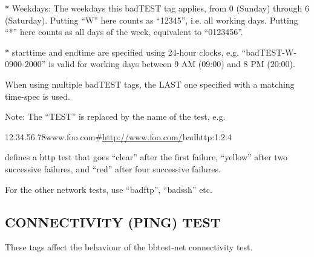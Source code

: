 \begin{description}
 * Weekdays: The weekdays this badTEST tag applies, from 0 (Sunday)
   through 6 (Saturday). Putting ``W'' here counts as ``12345'',
   i.e. all working days. Putting ``*'' here counts as all days of the
   week, equivalent to ``0123456''.  

 * starttime and endtime are specified using 24-hour clocks,
   e.g. ``badTEST-W-0900-2000'' is valid for working days between 9 AM
   (09:00) and 8 PM (20:00). 



  When using multiple badTEST tags, the LAST one specified with a matching time-spec is used. 


  Note: The ``TEST'' is replaced by the name of the test, e.g. 


  
12.34.56.78www.foo.com\#\url{http://www.foo.com/}badhttp:1:2:4 


  defines a http test that goes ``clear'' after the first failure,
  ``yellow'' after two successive failures, and ``red'' after four
  successive failures. 



  For the other network tests, use ``badftp'', ``badssh'' etc. 


 



\end{description}
\subsection{CONNECTIVITY (PING) TEST}
 These tags affect the behaviour of the bbtest-net connectivity test. 

